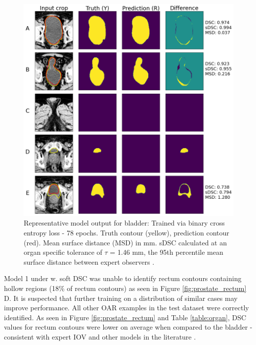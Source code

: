 \begin{figure}[H]
	\begin{center}
		\includegraphics[width=1.0\textwidth]{figures/prostate_BCE_bladder}
		\caption{Representative model output for bladder: Trained via binary cross
      entropy loss - 78 epochs. Truth contour (yellow), prediction contour
      (red). Mean surface distance (MSD) in mm. sDSC \cite{Nikolov_2018}
      calculated at an organ specific tolerance of $\tau$ = 1.46 mm, the 95th
      percentile mean surface distance between expert observers
      \cite{Roach_2019}.}
		\label{fig:prostate_BCE_bladder}
	\end{center}
\end{figure}

Model 1 under w. soft DSC was unable to identify rectum contours containing
hollow regions (18\% of rectum contours) as seen in Figure
\ref{fig:prostate_rectum} D. It is suspected that further training on a
distribution of similar cases may improve performance. All other OAR examples in
the test dataset were correctly identified. As seen in Figure
\ref{fig:prostate_rectum} and Table \ref{table:organ}, DSC values for rectum
contours were lower on average when compared to the bladder - consistent with
expert IOV \cite{Roach_2019} and other models in the literature \cite{Liu_2020,
Kazemifar_2018, Wong2020}.



